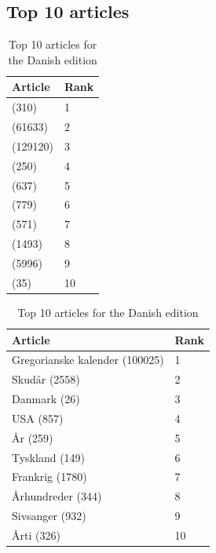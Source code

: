 \subsection{Top 10 articles}
\begin{table}[htbp]
    \begin{minipage}{.45\linewidth}
        \centering
        \begin{tabular}{ll}
            \toprule
            Article & Rank\\
            \midrule
            (310) & 1\\
            (61633) & 2\\
            (129120) & 3\\
            (250) & 4\\
            (637) & 5\\
            (779) & 6\\
            (571) & 7\\
            (1493) & 8\\
            (5996) & 9\\
            (35) & 10\\
            \bottomrule
        \end{tabular}
        \caption{Top 10 articles for the Arabic edition}
    \end{minipage}
    \hfill
    \begin{minipage}{.45\linewidth}
        \centering
        \begin{tabular}{ll}
            \toprule
            Article & Rank\\
            \midrule
            Gregorianske kalender (100025) & 1\\
            Skudår (2558) & 2\\
            Danmark (26) & 3\\
            USA (857) & 4\\
            År (259) & 5\\
            Tyskland (149) & 6\\
            Frankrig (1780) & 7\\
            Århundreder (344) & 8\\
            Sivsanger (932) & 9\\
            Årti (326) & 10\\
            \bottomrule
        \end{tabular}
        \caption{Top 10 articles for the Danish edition}
    \end{minipage}
\end{table}


